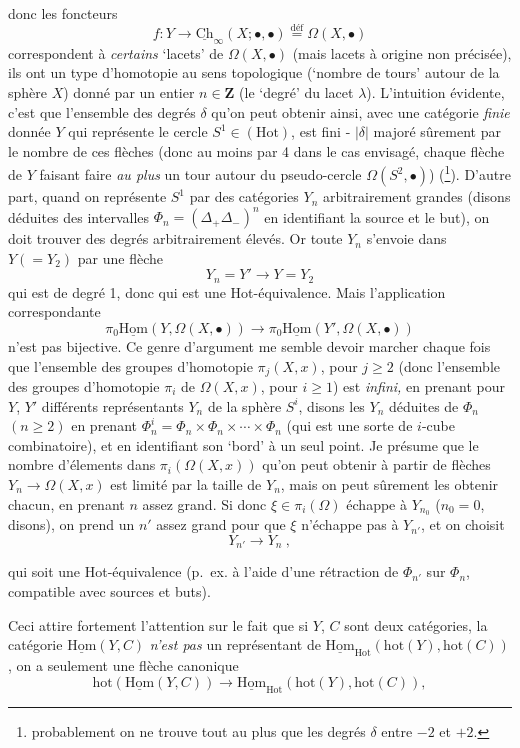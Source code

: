 \documentclass[11pt]{article}
\newcommand{\printedpage}[1]{\marginpar{\footnotesize p.~#1}}
\newcommand{\msp}[1]{\marginpar{\footnotesize [#1]}}
\newcommand{\Ch}{\underline{\mathrm{Ch}}}
\newcommand{\uHom}{\underline{\mathrm{Hom}}}
\newcommand{\Hot}{\mathrm{Hot}}
\begin{document}
\clearpage
\printedpage{83}

\msp{page 133}
donc les foncteurs
\[ f : Y\longrightarrow \Ch_\infty(X;\bullet,\bullet) \overset{\text{déf}}{=} \Omega(X,\bullet) \]
correspondent à \textit{certains} `lacets' de $\Omega(X,\bullet)$ (mais lacets à origine non précisée), ils ont un type d'homotopie au sens topologique (`nombre de tours' autour de la sphère $X$) donné par un entier $n\in\mathbf{Z}$ (le `degré' du lacet $\lambda$). L'intuition évidente, c'est que l'ensemble des degrés $\delta$ qu'on peut obtenir ainsi, avec une catégorie \textit{finie} donnée $Y$ qui représente le cercle $S^1\in(\Hot)$, est fini - $|\delta|$ majoré sûrement par le nombre de ces flèches (donc au moins par 4 dans le cas envisagé, chaque flèche de $Y$ faisant faire \textit{au plus} un tour autour du pseudo-cercle $\Omega(S^2,\bullet)$) (\footnote[28]{probablement on ne trouve tout au plus que les degrés $\delta$ entre $-2$ et $+2$.}). D'autre part, quand on représente $S^1$ par des catégories $Y_n$ arbitrairement grandes (disons déduites des intervalles $\Phi_n=(\Delta_+\Delta_-)^n$ en identifiant la source et le but), on doit trouver des degrés arbitrairement élevés. Or toute $Y_n$ s'envoie dans $Y(=Y_2)$ par une flèche
\[ Y_n = Y' \longrightarrow Y = Y_2 \]
\msp{page 134}
qui est de degré 1, donc qui est une Hot-équivalence. Mais l'application correspondante
\[ \pi_0\uHom(Y,\Omega(X,\bullet)) \longrightarrow \pi_0\uHom(Y',\Omega(X,\bullet)) \]
n'est pas bijective. Ce genre d'argument me semble devoir marcher chaque fois que l'ensemble des groupes d'homotopie $\pi_j(X,x)$, pour $j\geq 2$ (donc l'ensemble des groupes d'homotopie $\pi_i$ de $\Omega(X,x)$, pour $i\geq 1$) est \textit{infini,} en prenant pour $Y$, $Y'$ différents représentants $Y_n$ de la sphère $S^i$, disons les $Y_n$ déduites de $\Phi_n$ $(n\geq 2)$ en prenant $\Phi_n^i = \Phi_n\times\Phi_n\times\cdots\times\Phi_n$ (qui est une sorte de $i$-cube combinatoire), et en identifiant son `bord' à un seul point. Je présume que le nombre d'élements dans $\pi_i(\Omega(X,x))$ qu'on peut obtenir à partir de flèches $Y_n\longrightarrow\Omega(X,x)$ est limité par la taille de $Y_n$, mais on peut sûrement les obtenir chacun, en prenant $n$ assez grand. Si donc $\xi\in\pi_i(\Omega)$ échappe à $Y_{n_0}$ ($n_0=0$, disons), on prend un $n'$ assez grand pour que $\xi$ n'échappe pas à $Y_{n'}$, et on choisit %
\[ Y_{n'} \longrightarrow Y_n\ , \]


\msp{page 135}
qui soit une Hot-équivalence (p.~ex. à l'aide d'une rétraction de $\Phi_{n'}$ sur $\Phi_n$, compatible avec sources et buts).

Ceci attire fortement l'attention sur le fait que si $Y$, $C$ sont deux catégories, la catégorie $\uHom(Y,C)$ \textit{n'est pas} un représentant de $\uHom_{\Hot}(\mathrm{hot}(Y),\mathrm{hot}(C))$, on a seulement une flèche canonique
\[ \mathrm{hot}(\uHom(Y,C)) \longrightarrow \uHom_{\Hot}(\mathrm{hot}(Y),\mathrm{hot}(C)), \tag*{$(*)$} \]
\end{document}
